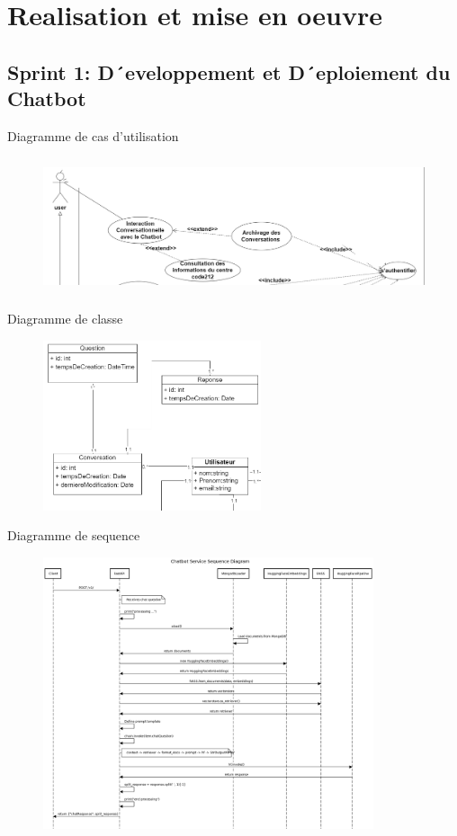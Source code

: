 \section{Realisation et mise en oeuvre}
\subsection{Sprint 1: D´eveloppement et D´eploiement du Chatbot}
\begin{frame}{Diagramme de cas d'utilisation}

    \begin{figure}[H]
        \centering
        \includegraphics[height=4cm]{assets/images/sprint1-usecase.png}
    \end{figure}
\end{frame}

\begin{frame}{Diagramme de classe}

    \begin{figure}[H]
        \centering
        \includegraphics[height=5cm]{assets/images/sprint1-class.png}
    \end{figure}
\end{frame}

\begin{frame}{Diagramme de sequence}
    \begin{figure}[H]
        \centering
        \includegraphics[height=8cm]{assets/images/chatbot-seq.png}
    \end{figure}
\end{frame}

